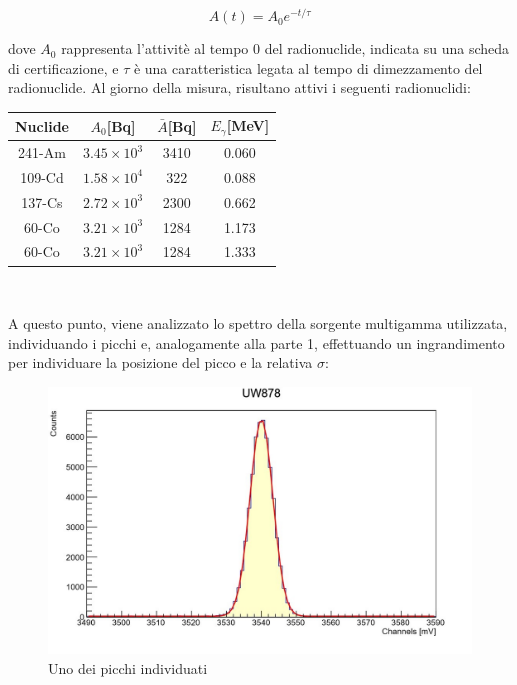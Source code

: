 \documentclass[a4paper,10pt]{article}
\begin{document}
\begin{equation}
	A(t)=A_{0}e^{-t/\tau}
\end{equation}

dove $A_{0}$ rappresenta l'attivit\`e al tempo 0 del radionuclide, indicata su una scheda di certificazione, e $\tau$ \`e una caratteristica legata al tempo di dimezzamento del radionuclide. Al giorno della misura, risultano attivi i seguenti radionuclidi:

\begin{center}
    \begin{tabular}{cccc}
        \toprule
        Nuclide & $A_{0}$[Bq] & $\bar{A}$[Bq] & $E_{\gamma}$[MeV]\\
        \midrule
         241-Am & $3.45 \times 10^3$ & 3410 & 0.060\\
	  109-Cd & $1.58 \times 10^4$ & 322 & 0.088\\
	  137-Cs & $2.72 \times 10^3$ & 2300 & 0.662\\
	  60-Co & $3.21 \times 10^3$ & 1284 & 1.173\\
	  60-Co & $3.21 \times 10^3$ & 1284 & 1.333\\
        \bottomrule
    \end{tabular}\\
\end{center}

A questo punto, viene analizzato lo spettro della sorgente multigamma utilizzata, individuando i picchi e, analogamente alla parte 1, effettuando un ingrandimento per individuare la posizione del picco e la relativa $\sigma$:

\begin{figure}[H]
    \centering
    \includegraphics[scale=0.45]{grafici/piccouw878}
    \caption{Uno dei picchi individuati}
\end{figure}
\end{document}
